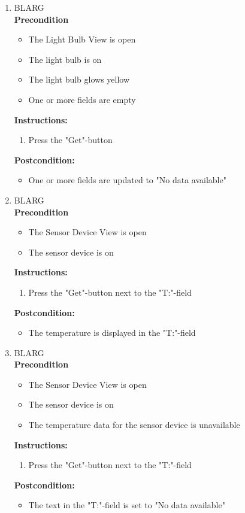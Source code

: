 \documentclass[a4paper]{article}
\newlength{\testlabellength}
\newenvironment{testlist}{\begin{enumerate}[label=\bfseries Instruction \thesubsection.\arabic* , labelindent=0pt, labelwidth=\testlabellength , leftmargin=2cm]}{\end{enumerate}}
\newenvironment{precondition}{
{\color{white}BLARG}\\ 
\textbf{Precondition}
\begin{itemize}[labelindent=0cm, labelwidth=2cm , leftmargin=1cm]
}
{\end{itemize}}
\newenvironment{instruction}{
\textbf{Instructions:}
\begin{enumerate}[label=\bfseries  \arabic*., labelindent=0cm, labelwidth=2cm , leftmargin=1cm]
}
{\end{enumerate}}
\newenvironment{postcondition}{
\textbf{Postcondition:}
\begin{itemize}[labelindent=0cm, labelwidth=2cm , leftmargin=1cm]
}
{\end{itemize}}
\begin{document}
\begin{appendices}
\begin{testlist}
	\item
		\begin{precondition}
			\item The Light Bulb View is open
			\item The light bulb is on
			\item The light bulb glows yellow
			\item One or more fields are empty
		\end{precondition}
		\begin{instruction}
			\item Press the "Get"-button
		\end{instruction}
		\begin{postcondition}
			\item One or more fields are updated to "No data available"
		\end{postcondition}

	\item
		\begin{precondition}
			\item The Sensor Device View is open
			\item The sensor device is on
		\end{precondition}
		\begin{instruction}
			\item Press the "Get"-button next to the "T:"-field
		\end{instruction}
		\begin{postcondition}
			\item The temperature is displayed in the "T:"-field
		\end{postcondition}

	\item
		\begin{precondition}
			\item The Sensor Device View is open
			\item The sensor device is on
			\item The temperature data for the sensor device is unavailable
		\end{precondition}
		\begin{instruction}
			\item Press the "Get"-button next to the "T:"-field
		\end{instruction}
		\begin{postcondition}
			\item The text in the "T:"-field is set to "No data available"
		\end{postcondition}



\end{testlist}
\end{appendices}
\end{document}
